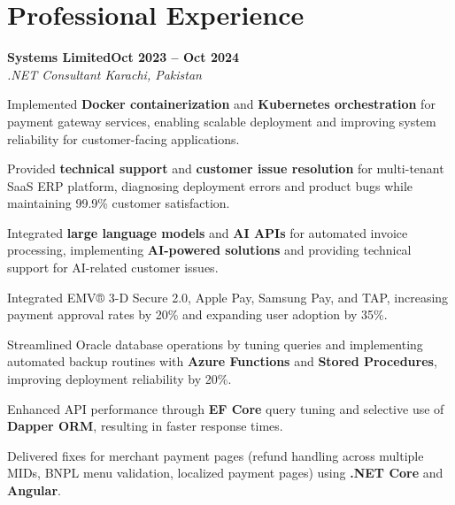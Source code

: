 \documentclass[letterpaper,10pt]{article}
\newcommand{\headingBf}[2]{
  \hspace{10pt}\textbf{#1}\hfill\textbf{#2}\\
}
\newcommand{\headingIt}[2]{
  \hspace{10pt}\textit{#1}\hfill\textit{#2}\\
}
\newenvironment{resume_list}{
  \vspace{-7pt}
  \begin{itemize}[itemsep=-2px, parsep=1pt, leftmargin=30pt]
}{
  \end{itemize}
}
\begin{document}
\section{Professional Experience}

\headingBf{Systems Limited}{Oct 2023 -- Oct 2024}
\headingIt{.NET Consultant \hfill Karachi, Pakistan}{}
\begin{resume_list}
    \item Implemented \textbf{Docker containerization} and \textbf{Kubernetes orchestration} for payment gateway services, enabling scalable deployment and improving system reliability for customer-facing applications.
    \item Provided \textbf{technical support} and \textbf{customer issue resolution} for multi-tenant SaaS ERP platform, diagnosing deployment errors and product bugs while maintaining 99.9\% customer satisfaction.
    \item Integrated \textbf{large language models} and \textbf{AI APIs} for automated invoice processing, implementing \textbf{AI-powered solutions} and providing technical support for AI-related customer issues.
    \item Integrated EMV® 3-D Secure 2.0, Apple Pay, Samsung Pay, and TAP, increasing payment approval rates by 20\% and expanding user adoption by 35\%.
    \item Streamlined Oracle database operations by tuning queries and implementing automated backup routines with \textbf{Azure Functions} and \textbf{Stored Procedures}, improving deployment reliability by 20\%.
    \item Enhanced API performance through \textbf{EF Core} query tuning and selective use of \textbf{Dapper ORM}, resulting in faster response times.
    \item Delivered fixes for merchant payment pages (refund handling across multiple MIDs, BNPL menu validation, localized payment pages) using \textbf{.NET Core} and \textbf{Angular}.
\end{resume_list}
\end{document}
